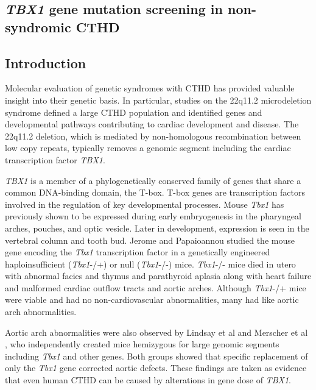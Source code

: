 \begin{refsection}

\chapter{\textit{TBX1} gene mutation screening in non-syndromic CTHD} %
\label{Chapter4} %


\section{Introduction}
Molecular evaluation of genetic syndromes with CTHD has provided valuable insight into their genetic basis. In particular, studies on the 22q11.2 microdeletion syndrome defined a large CTHD population and identified genes and developmental pathways contributing to cardiac development and disease. The 22q11.2 deletion, which is mediated by non-homologous recombination between low copy repeats, typically removes a genomic segment including the cardiac transcription factor \textit{TBX1}. 

\textit{TBX1} is a member of a phylogenetically conserved family of genes that share a common DNA-binding domain, the T-box. T-box genes are transcription factors involved in the regulation of key developmental processes. Mouse \textit{Tbx1} has previously shown to be expressed during early embryogenesis in the pharyngeal arches, pouches, and optic vesicle. Later in development, expression is seen in the vertebral column and tooth bud. Jerome and Papaioannou \cite{jerome2001digeorge} studied the mouse gene encoding the \textit{Tbx1} transcription factor in a genetically engineered haploinsufficient (\textit{Tbx1}-/+) or null (\textit{Tbx1}-/-) mice. \textit{Tbx1}-/- mice died in utero with abnormal facies and thymus and parathyroid aplasia along with heart failure and malformed cardiac outflow tracts and aortic arches. Although \textit{Tbx1}-/+ mice were viable and had no non-cardiovascular abnormalities, many had like aortic arch abnormalities.

Aortic arch abnormalities were also observed by Lindsay et al \cite{lindsay1999congenital, lindsay2001tbx1} and Merscher et al \cite{merscher2001tbx1}, who independently created mice hemizygous for large genomic segments including \textit{Tbx1} and other genes. Both groups showed that specific replacement of only the \textit{Tbx1} gene corrected aortic defects. These findings are taken as evidence that even human CTHD can be caused by alterations in gene dose of \textit{TBX1}. 


\end{refsection}
